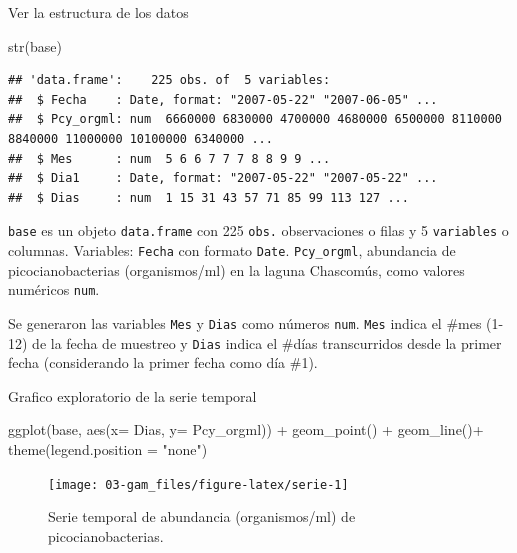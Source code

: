 \documentclass[
]{book}
\newenvironment{Shaded}{\begin{snugshade}}{\end{snugshade}}
\newcommand{\AttributeTok}[1]{\textcolor[rgb]{0.77,0.63,0.00}{#1}}
\newcommand{\FunctionTok}[1]{\textcolor[rgb]{0.00,0.00,0.00}{#1}}
\newcommand{\NormalTok}[1]{#1}
\newcommand{\SpecialCharTok}[1]{\textcolor[rgb]{0.00,0.00,0.00}{#1}}
\newcommand{\StringTok}[1]{\textcolor[rgb]{0.31,0.60,0.02}{#1}}
\begin{document}
Ver la estructura de los datos

\begin{Shaded}
\begin{Highlighting}[]
\FunctionTok{str}\NormalTok{(base)}
\end{Highlighting}
\end{Shaded}

\begin{verbatim}
## 'data.frame':    225 obs. of  5 variables:
##  $ Fecha    : Date, format: "2007-05-22" "2007-06-05" ...
##  $ Pcy_orgml: num  6660000 6830000 4700000 4680000 6500000 8110000 8840000 11000000 10100000 6340000 ...
##  $ Mes      : num  5 6 6 7 7 7 8 8 9 9 ...
##  $ Dia1     : Date, format: "2007-05-22" "2007-05-22" ...
##  $ Dias     : num  1 15 31 43 57 71 85 99 113 127 ...
\end{verbatim}

\texttt{base} es un objeto \texttt{data.frame} con 225 \texttt{obs.} observaciones o filas y 5 \texttt{variables} o columnas.
Variables: \texttt{Fecha} con formato \texttt{Date}. \texttt{Pcy\_orgml}, abundancia de picocianobacterias (organismos/ml) en la laguna Chascomús, como valores numéricos \texttt{num}.

Se generaron las variables \texttt{Mes} y \texttt{Dias} como números \texttt{num}. \texttt{Mes} indica el \#mes (1-12) de la fecha de muestreo y \texttt{Dias} indica el \#días transcurridos desde la primer fecha (considerando la primer fecha como día \#1).

Grafico exploratorio de la serie temporal

\begin{Shaded}
\begin{Highlighting}[]
\FunctionTok{ggplot}\NormalTok{(base, }\FunctionTok{aes}\NormalTok{(}\AttributeTok{x=}\NormalTok{ Dias, }\AttributeTok{y=}\NormalTok{ Pcy\_orgml))  }\SpecialCharTok{+}
  \FunctionTok{geom\_point}\NormalTok{()  }\SpecialCharTok{+}
  \FunctionTok{geom\_line}\NormalTok{()}\SpecialCharTok{+}
  \FunctionTok{theme}\NormalTok{(}\AttributeTok{legend.position =} \StringTok{"none"}\NormalTok{)}
\end{Highlighting}
\end{Shaded}

\begin{figure}

{\centering \texttt{[image: 03-gam\_files/figure-latex/serie-1]} 

}

\caption{Serie temporal de abundancia (organismos/ml) de picocianobacterias.}\label{fig:serie}
\end{figure}
\end{document}
